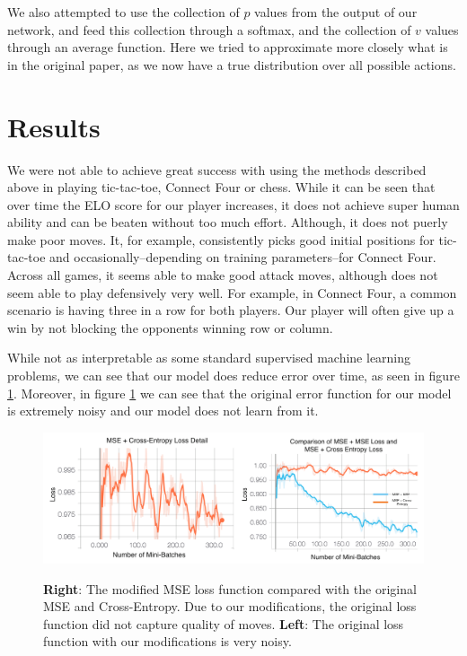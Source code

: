 \documentclass[english]{article}
\begin{document}
We also attempted to use the collection of $p$ values from the output of our
network, and feed this collection through a softmax, and the collection of $v$
values through an average function. Here we tried to approximate more closely
what is in the original paper, as we now have a true distribution over all
possible actions.
\section{Results}

We were not able to achieve great success with using the methods described above
in playing tic-tac-toe, Connect Four or chess. While it can be seen that over
time the ELO score for our player increases, it does not achieve super human
ability and can be beaten without too much effort. Although, it does not puerly
make poor moves. It, for example, consistently picks good initial positions for
tic-tac-toe and occasionally--depending on training parameters--for Connect
Four. Across all games, it seems able to make good attack moves, although does
not seem able to play defensively very well. For example, in Connect Four, a
common scenario is having three in a row for both players. Our player will often
give up a win by not blocking the opponents winning row or column.

While not as interpretable as some standard supervised machine learning
problems, we can see that our model does reduce error over time, as seen in
figure \ref{fig:lossMSE}. Moreover, in figure \ref{fig:lossMSE} we can see that the original
error function for our model is extremely noisy and our model does not learn
from it.

\begin{figure}
\centering
\includegraphics[width=\textwidth]{plots}
    \label{fig:lossMSE}
    \caption{\textbf{Right}: The modified MSE loss function compared with the original MSE and
    Cross-Entropy. Due to our modifications, the original loss function did not
    capture quality of moves. \textbf{Left}: The original loss function with our modifications is very noisy.}
\end{figure}
\end{document}
